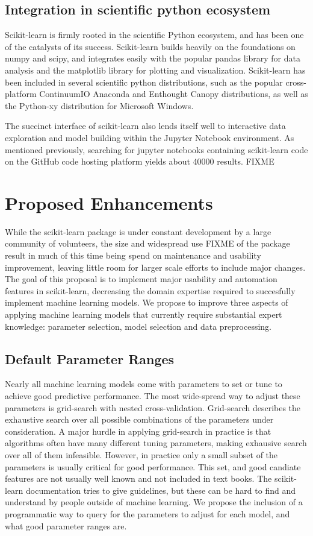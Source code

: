 \subsection{Integration in scientific python ecosystem}
Scikit-learn is firmly rooted in the scientific Python ecosystem, and has been
one of the catalysts of its success. Scikit-learn builds heavily on the
foundations on numpy and scipy, and integrates easily with the popular pandas
library for data analysis and the matplotlib library for plotting and
visualization.
Scikit-learn has been included in several scientific python distributions, such
as the popular cross-platform ContinuumIO Anaconda and Enthought Canopy
distributions, as well as the Python-xy distribution for Microsoft Windows.

The succinct interface of scikit-learn also lends itself well to interactive
data exploration and model building within the Jupyter Notebook environment.
As mentioned previously, searching for jupyter notebooks containing
scikit-learn code on the GitHub code hosting platform yields about 40000
results. FIXME

\section{Proposed Enhancements}
While the scikit-learn package is under constant development by a large community
of volunteers, the size and widespread use FIXME of the package result in much of this
time being spend on maintenance and usability improvement, leaving little room
for larger scale efforts to include major changes. The goal of this proposal
is to implement major usability and automation features in scikit-learn, decreasing
the domain expertise required to succesfully implement machine learning models.
We propose to improve three aspects of applying machine learning models that
currently require substantial expert knowledge: parameter selection, model
selection and data preprocessing.

\subsection{Default Parameter Ranges}
Nearly all machine learning models come with parameters to set or tune
to achieve good predictive performance. The most wide-spread way to adjust
these parameters is grid-search with nested cross-validation.
Grid-search describes the exhaustive search over all possible combinations
of the parameters under consideration.
A major hurdle in applying grid-search in practice is that algorithms
often have many different tuning parameters, making exhausive search
over all of them infeasible. However, in practice only a small subset
of the parameters is usually critical for good performance. This set,
and good candiate features are not usually well known and not included in text books.
The scikit-learn documentation tries to give guidelines, but these can be hard
to find and understand by people outside of machine learning.
We propose the inclusion of a programmatic way to query for the parameters
to adjust for each model, and what good parameter ranges are.

